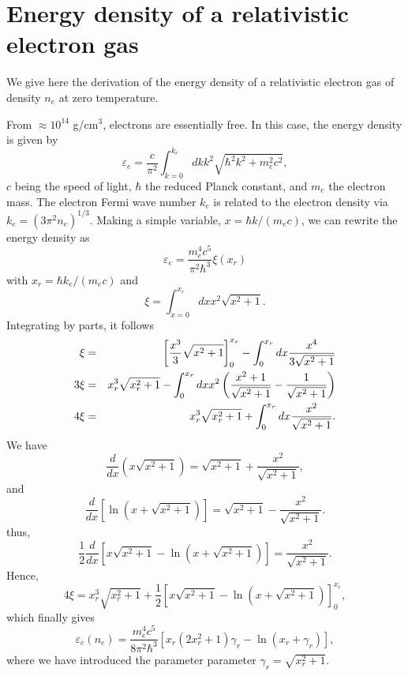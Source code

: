 \appendix
\chapter{Energy density of a relativistic electron gas}\label{appendix:epse}

We give here the derivation of the energy density of a relativistic electron
gas of density $n_e$ at zero temperature.

From $\approx 10^{14}$ g/cm$^3$, electrons are essentially free. In this
case, the energy density is given by
%
\begin{equation}
  \varepsilon_e = \frac{c}{\pi^2}\int_{k=0}^{k_{e}} dk k^2 
  \sqrt{\hbar^2 k^2 + m_e^2c^2},
\end{equation}
%
$c$ being the speed of light, $\hbar$ the reduced Planck constant, and $m_e$
the electron mass. The electron Fermi wave number $k_e$ is related to the
electron density via $k_e = (3\pi^2n_e)^{1/3}$. Making a simple variable, 
$x = \hbar k/(m_ec)$, we can rewrite the energy density as
%
\begin{equation}
  \varepsilon_e = \frac{m_e^4c^5}{\pi^2\hbar^3}\xi(x_r)
\end{equation}
%
with $x_r = \hbar k_e/(m_ec)$ and
%
\begin{equation}
  \xi = \int_{x=0}^{x_r} dx x^2\sqrt{x^2+1}.
\end{equation}
%
Integrating by parts, it follows
%
\begin{eqnarray}
  \xi &=& \left[\frac{x^3}{3}\sqrt{x^2 + 1}\right]_0^{x_r} -
  \int_0^{x_r}dx\frac{x^4}{3\sqrt{x^2+1}}\notag\\
  3\xi &=& x_r^3\sqrt{x_r^2+1} 
  - \int_0^{x_r}dx x^2 \left(\frac{x^2+1}{\sqrt{x^2
  + 1}} - \frac{1}{\sqrt{x^2+1}}\right)\notag\\
        4\xi &=& x_r^3\sqrt{x_r^2+1} + \int_0^{x_r}dx \frac{x^2}{\sqrt{x^2+1}}.
\end{eqnarray}
%
We have
%
\begin{equation}
  \frac{d}{dx}\left(x\sqrt{x^2 + 1}\right) = \sqrt{x^2+1} 
  + \frac{x^2}{\sqrt{x^2+1}},
\end{equation}
%
and
%
\begin{equation}
  \frac{d}{dx}\left[\ln(x + \sqrt{x^2+1})\right] = \sqrt{x^2+1} -
  \frac{x^2}{\sqrt{x^2+1}}.
\end{equation}
%
thus,
%
\begin{equation}
  \frac{1}{2}\frac{d}{dx}\left[x\sqrt{x^2+1} -
  \ln\left(x+\sqrt{x^2+1}\right)\right] = \frac{x^2}{\sqrt{x^2+1}}.
\end{equation}
%
Hence,
%
\begin{equation}
  4\xi = x_r^3\sqrt{x_r^2+1} + \frac{1}{2}\left[x\sqrt{x^2+1} -
  \ln\left(x+\sqrt{x^2+1}\right)\right]_0^{x_r},
\end{equation}
%
which finally gives
%
\begin{equation}
  \varepsilon_e(n_e) = \frac{m_e^4c^5}{8\pi^2\hbar^3}\left[x_r(2x_r^2 +
  1)\gamma_r - \ln(x_r + \gamma_r)\right], 
\end{equation}
%
where we have introduced the parameter parameter $\gamma_r = \sqrt{x_r^2+1}$.

